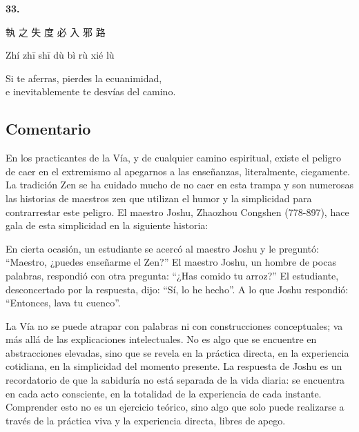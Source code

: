 \documentclass[
  a5paperpaper,
]{article}
\begin{document}
\hfill\break

\hypertarget{03}{}
\begin{verseblock}

\newpage

\begin{center}\textbf{33.}\end{center}

執 之 失 度 必 入 邪 路

Zhí zhī shī dù bì rù xié lù

Si te aferras, pierdes la ecuanimidad,\\
e inevitablemente te desvías del camino.

\end{verseblock}

\hfill\break

\hypertarget{comentario-32}{%
\subsection{Comentario}\label{comentario-32}}

En los practicantes de la Vía, y de cualquier camino espiritual, existe
el peligro de caer en el extremismo al apegarnos a las enseñanzas,
literalmente, ciegamente. La tradición Zen se ha cuidado mucho de no
caer en esta trampa y son numerosas las historias de maestros zen que
utilizan el humor y la simplicidad para contrarrestar este peligro. El
maestro Joshu, Zhaozhou Congshen (778-897), hace gala de esta
simplicidad en la siguiente historia:

En cierta ocasión, un estudiante se acercó al maestro Joshu y le
preguntó: ``Maestro, ¿puedes enseñarme el Zen?'' El maestro Joshu, un
hombre de pocas palabras, respondió con otra pregunta: ``¿Has comido tu
arroz?'' El estudiante, desconcertado por la respuesta, dijo: ``Sí, lo
he hecho''. A lo que Joshu respondió: ``Entonces, lava tu cuenco''.

La Vía no se puede atrapar con palabras ni con construcciones
conceptuales; va más allá de las explicaciones intelectuales. No es algo
que se encuentre en abstracciones elevadas, sino que se revela en la
práctica directa, en la experiencia cotidiana, en la simplicidad del
momento presente. La respuesta de Joshu es un recordatorio de que la
sabiduría no está separada de la vida diaria: se encuentra en cada acto
consciente, en la totalidad de la experiencia de cada instante.
Comprender esto no es un ejercicio teórico, sino algo que solo puede
realizarse a través de la práctica viva y la experiencia directa, libres
de apego.
\end{document}
